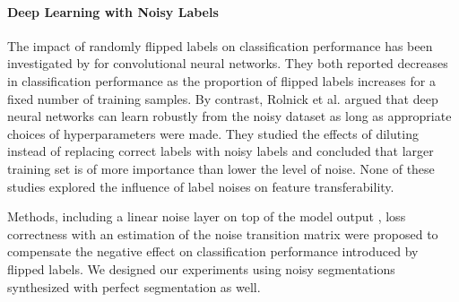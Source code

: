 
\paragraph{Deep Learning with Noisy Labels}

The impact of randomly flipped labels on classification performance has been investigated by  \cite{sukhbaatar2014training,patrini2016making} for convolutional neural networks.
They both reported decreases in classification performance as the proportion of flipped labels increases for a fixed number of training samples.
By contrast, Rolnick et al. \cite{rolnick2017deep} argued that deep neural networks can learn robustly from the noisy dataset as long as appropriate choices of hyperparameters were made.
They studied the effects of diluting instead of replacing correct labels with noisy labels and concluded that larger training set is of more importance than lower the level of noise.
None of these studies explored the influence of label noises on feature transferability.

Methods, including a linear noise layer on top of the model output \cite{sukhbaatar2014training}, loss correctness with an estimation of the noise transition matrix \cite{patrini2016making} were proposed to compensate the negative effect on classification performance introduced by flipped labels.
We designed our experiments using noisy segmentations synthesized with perfect segmentation as well.


